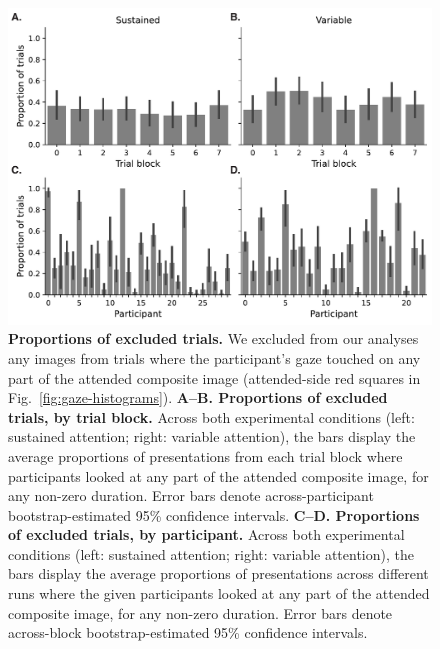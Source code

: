 \documentclass{article}
\begin{document}
  \begin{figure}[tp]
	\centering
	\includegraphics[width=1\textwidth]{figs/gaze_intersections}
  
\caption{\textbf{Proportions of excluded trials.} We excluded from our analyses
any images from trials where the participant's gaze touched on any part of the
attended composite image (attended-side red squares in
Fig.~\ref{fig:gaze-histograms}). \textbf{A--B. Proportions of excluded trials,
by trial block.} Across both experimental conditions (left: sustained
attention; right: variable attention), the bars display the average proportions
of presentations from each trial block where participants looked at any part of the
attended composite image, for any non-zero duration. Error bars denote
across-participant bootstrap-estimated 95\% confidence intervals. \textbf{C--D.
Proportions of excluded trials, by participant.} Across both experimental
conditions (left: sustained attention; right: variable attention), the bars
display the average proportions of presentations across different runs where
the given participants looked at any part of the attended composite image, for
any non-zero duration. Error bars denote across-block bootstrap-estimated 95\%
confidence intervals.}

  \label{fig:gaze-intersections}
\end{figure}
\end{document}
